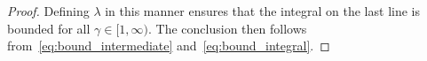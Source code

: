 \documentclass[11pt,a4paper]{article}
\begin{document}
\begin{proof}
    Defining $\lambda$ in this manner ensures that the integral on the last line is bounded for all $\gamma \in [1, \infty)$.
    The conclusion then follows from~\eqref{eq:bound_intermediate} and~\eqref{eq:bound_integral}.
\end{proof}
\end{document}
